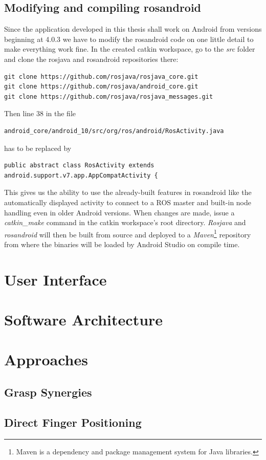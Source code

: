 \subsection{Modifying and compiling rosandroid}
\label{impl:compiling_rosandroid}

Since the application developed in this thesis shall work on Android from versions beginning at 4.0.3 we have to modify the rosandroid code on one little detail to make everything work fine. In the created catkin workspace, go to the \textit{src} folder and clone the rosjava and rosandroid repositories there:
\begin{lstlisting}[caption={Cloning the rosandroid and rosjava repositories}]
git clone https://github.com/rosjava/rosjava_core.git
git clone https://github.com/rosjava/android_core.git
git clone https://github.com/rosjava/rosjava_messages.git
\end{lstlisting}

Then line 38 in the file
\begin{lstlisting}[numbers=none]
android_core/android_10/src/org/ros/android/RosActivity.java
\end{lstlisting}

has to be replaced by

\begin{lstlisting}[caption={Change to make to RosActivity.java},firstnumber=38,breaklines=true]
public abstract class RosActivity extends android.support.v7.app.AppCompatActivity {
\end{lstlisting}

This gives us the ability to use the already-built features in rosandroid like the automatically displayed activity to connect to a ROS master and built-in node handling even in older Android versions. When changes are made, issue a \textit{catkin\_make} command in the catkin workspace's root directory. \textit{Rosjava} and \textit{rosandroid} will then be built from source and deployed to a \textit{Maven}\footnote{Maven is a dependency and package management system for Java libraries.} repository from where the binaries will be loaded by Android Studio on compile time.

\section{User Interface}
\section{Software Architecture}
\section{Approaches}
\subsection{Grasp Synergies}
\subsection{Direct Finger Positioning}